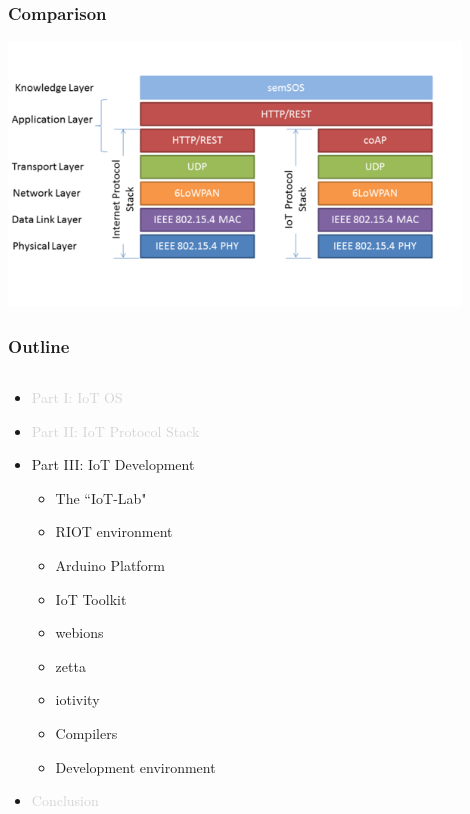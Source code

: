 \documentclass{beamer}
\begin{document}
\begin{frame}
	\frametitle{Comparison}
	\vspace{.5cm}
	\hspace*{.5cm} \includegraphics[width=12cm]{figs/Web-and-IoT-Stacks-2.png}
\end{frame}
\begin{frame}
	\frametitle{Outline}
	\begin{columns}[c]
		\begin{column}{30cm}
			\vspace{.1cm}
			\begin{itemize}
				\justifying
				\item \textcolor{LightGray}{Part I: IoT OS}
				\item \textcolor{LightGray}{Part II: IoT Protocol Stack}
				\item Part III: IoT Development
				\begin{itemize}
					\item The ``IoT-Lab" 
					\item RIOT environment
					\item Arduino Platform
					\item IoT Toolkit
					\item webions
					\item zetta
					\item iotivity
					\item Compilers
					\item Development environment
				\end{itemize}
				\item \textcolor{LightGray}{Conclusion}
			\end{itemize}
		\end{column}
	\end{columns}
\end{frame}
\end{document}
